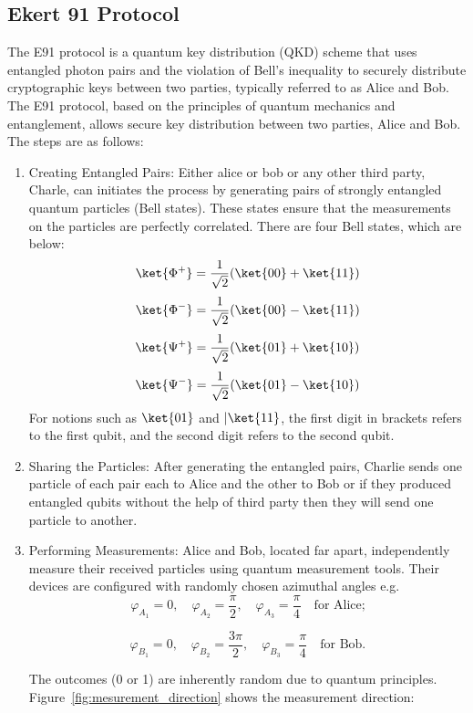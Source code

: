 \documentclass{article}
\begin{document}
\subsection{Ekert 91 Protocol}
\label{sec:e91}
The E91 protocol is a quantum key distribution (QKD) scheme that uses entangled photon pairs and the violation of Bell's inequality to securely distribute cryptographic keys between two parties, typically referred to as Alice and Bob. The E91 protocol, based on the principles of quantum mechanics and entanglement, allows secure key distribution between two parties, Alice and Bob. The steps are as follows:
\begin{enumerate}
    \item Creating Entangled Pairs: Either alice or bob or any other third party, Charle, can initiates the process by generating pairs of strongly entangled quantum particles (Bell states). These states ensure that the measurements on the particles are perfectly correlated. There are four Bell states, which are below:
          \[\ket{\Phi^{+}}=\frac{1}{\sqrt{2}}(\ket{00}+\ket{11})\]
          \[\ket{\Phi^{-}}=\frac{1}{\sqrt{2}}(\ket{00}-\ket{11})\]
          \[\ket{\Psi^{+}}=\frac{1}{\sqrt{2}}(\ket{01}+\ket{10})\]
          \[\ket{\Psi^{-}}=\frac{1}{\sqrt{2}}(\ket{01}-\ket{10})\]
          For notions such as $\ket{01}$ and $|\ket{11}$, the first digit in brackets refers to the first qubit, and the second digit refers to the second qubit.

    \item Sharing the Particles: After generating the entangled pairs, Charlie sends one particle of each pair each to Alice and the other to Bob or if they produced entangled qubits without the help of third party then they will send one particle to another.
    \item Performing Measurements: Alice and Bob, located far apart, independently measure their received particles using quantum measurement tools. Their devices are configured with randomly chosen azimuthal angles e.g.  \[
              \varphi_{A_1} = 0, \quad \varphi_{A_2} = \frac{\pi}{2}, \quad \varphi_{A_3} = \frac{\pi}{4} \quad \text{for Alice;}
          \]

          \[
              \varphi_{B_1} = 0, \quad \varphi_{B_2} = \frac{3\pi}{2}, \quad \varphi_{B_3} = \frac{\pi}{4} \quad \text{for Bob.}
          \]

          The outcomes (0 or 1) are inherently random due to quantum principles.
          Figure~\ref{fig:mesurement_direction} shows the measurement direction:


\end{enumerate}
\end{document}
